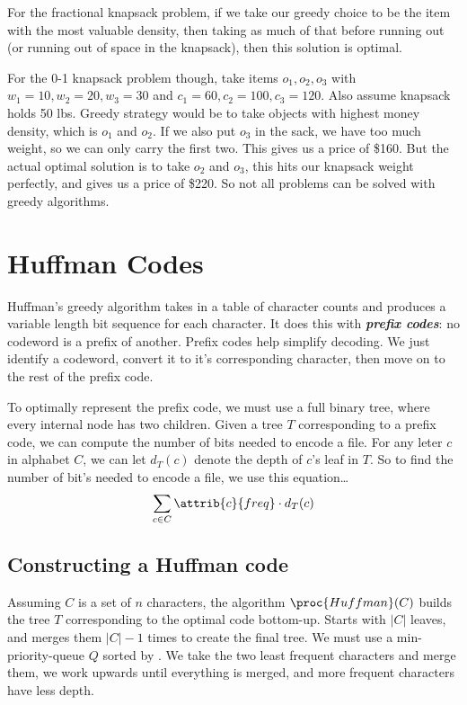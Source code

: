 \documentclass[11pt]{article}
\theoremstyle{definition}
\begin{document}
For the fractional knapsack problem, if we take our greedy choice to be the item with the most 
valuable density, then taking as much of that before running out (or running out of space in 
the knapsack), then this solution is optimal.  

For the 0-1 knapsack problem though, take items \(o_1, o_2, o_3\) with \(w_1=10, w_2=20, w_3=30\) 
and \(c_1=60, c_2=100, c_3=120\).  Also assume knapsack holds 50 lbs.  Greedy strategy would be 
to take objects with highest money density, which is \(o_1\) and \(o_2\).  If we also put \(o_3\) 
in the sack, we have too much weight, so we can only carry the first two.  This gives us a price 
of \$160.  But the actual optimal solution is to take \(o_2\) and \(o_3\), this hits our 
knapsack weight perfectly, and gives us a price of \$220.  So not all problems can be solved with 
greedy algorithms.
\newpage

\section*{Huffman Codes}
Huffman's greedy algorithm takes in a table of character counts and produces a variable length 
bit sequence for each character. It does this with \textbf{\textit{prefix codes}}: no codeword is 
a prefix of another.  Prefix codes help simplify decoding.  We just identify a codeword, convert 
it to it's corresponding character, then move on to the rest of the prefix code.

To optimally represent the prefix code, we must use a full binary tree, where every internal node 
has two children.  Given a tree \(T\) corresponding to a prefix code, we can compute the number of 
bits needed to encode a file.  For any leter \(c\) in alphabet \(C\), we can let \(d_T(c)\) 
denote the depth of \(c\)'s leaf in \(T\).  So to find the number of bit's needed to encode a 
file, we use this equation\dots 
\[\sum_{c \in C} \attrib{c}{freq} \cdot d_T(c)\]

\subsection*{Constructing a Huffman code}
Assuming \(C\) is a set of \(n\) characters, the algorithm \(\proc{Huffman}(C)\) builds the tree 
\(T\) corresponding to the optimal code bottom-up.  Starts with \(|C|\) leaves, and merges them 
\(|C|-1\) times to create the final tree.  We must use a min-priority-queue \(Q\) sorted by 
.  We take the two least frequent characters and merge them, we work upwards 
until everything is merged, and more frequent characters have less depth.
\end{document}
